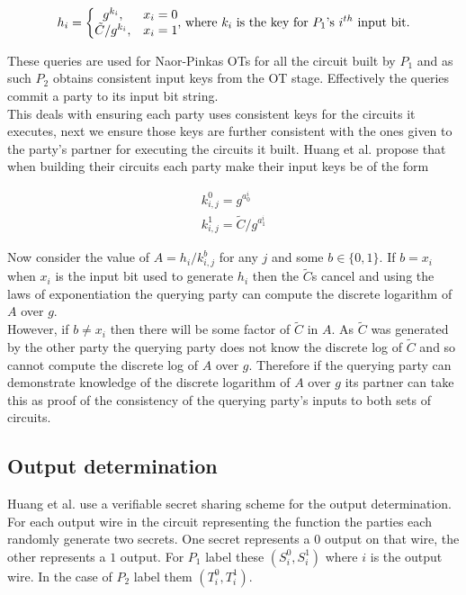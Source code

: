 \documentclass[ %
                    author={Nicholas Tutte},
                supervisor={Prof. Nigel Smart},
                    degree={MEng},
                     title={Secure Two Party Computation},
                  subtitle={A practical comparison of recent protocols},
                      type={Research - GG1K},
                      year={2015} ]{dissertation}
\begin{document}
				$$
				h_i = \bigg\{
					\begin{matrix}
						g^{k_i}, & x_i = 0\\
						\tilde C / g^{k_i}, & x_i = 1
					\end{matrix}
					\textnormal{,  where } k_i \textnormal{ is the key for } P_1 \textnormal{'s } i^{th} \textnormal{ input bit.}
				$$

				These queries are used for Naor-Pinkas OTs for all the circuit built by $P_1$ and as such $P_2$ obtains consistent input keys from the OT stage. Effectively the queries commit a party to its input bit string.\\

				This deals with ensuring each party uses consistent keys for the circuits it executes, next we ensure those keys are further consistent with the ones given to the party's partner for executing the circuits it built. Huang et al. propose that when building their circuits each party make their input keys be of the form
				
				$$
				\begin{matrix}
					k_{i,j}^0 = g^{a_0^i}\\
					k_{i,j}^1 = \tilde C / g^{a_1^i}
				\end{matrix}
				$$

				Now consider the value of $A = h_i / k_{i,j}^{b}$ for any $j$ and some $b \in \{0, 1\}$. If $b = x_i$ when $x_i$ is the input bit used to generate $h_i$ then the $\tilde C$s cancel and using the laws of exponentiation the querying party can compute the discrete logarithm of $A$ over $g$.\\

				However, if $b \neq x_i$ then there will be some factor of $\tilde C$ in $A$. As $\tilde C$ was generated by the other party the querying party does not know the discrete log of $\tilde C$ and so cannot compute the discrete log of $A$ over $g$. Therefore if the querying party can demonstrate knowledge of the discrete logarithm of $A$ over $g$ its partner can take this as proof of the consistency of the querying party's inputs to both sets of circuits.

			\subsection{Output determination}
				Huang et al. use a verifiable secret sharing scheme for the output determination. For each output wire in the circuit representing the function the parties each randomly generate two secrets. One secret represents a $0$ output on that wire, the other represents a $1$ output. For $P_1$ label these $(S_i^0, S_i^1)$ where $i$ is the output wire. In the case of $P_2$ label them $(T_i^0, T_i^1)$.\\
\end{document}
